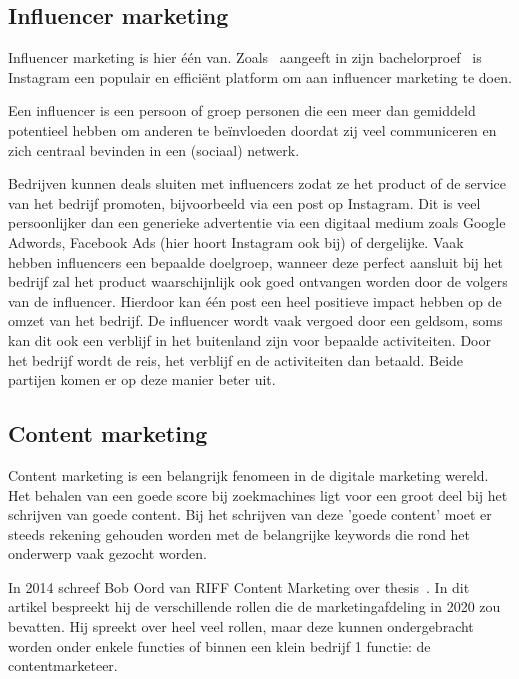 \subsection{Influencer marketing}
\label{sec:influencer-marketing}
Influencer marketing is hier één van. Zoals~\textcite{Pieters2018} aangeeft in zijn bachelorproef~ is Instagram een populair en efficiënt platform om aan influencer marketing te doen. 

Een influencer is een persoon of groep personen die een meer dan gemiddeld potentieel hebben om anderen te beïnvloeden doordat zij veel communiceren en zich centraal bevinden in een (sociaal) netwerk.~\autocite{Pieters2018}

Bedrijven kunnen deals sluiten met influencers zodat ze het product of de service van het bedrijf promoten, bijvoorbeeld via een post op Instagram. Dit is veel persoonlijker dan een generieke advertentie via een digitaal medium zoals Google Adwords, Facebook Ads (hier hoort Instagram ook bij) of dergelijke. Vaak hebben influencers een bepaalde doelgroep, wanneer deze perfect aansluit bij het bedrijf zal het product waarschijnlijk ook goed ontvangen worden door de volgers van de influencer. Hierdoor kan één post een heel positieve impact hebben op de omzet van het bedrijf. De influencer wordt vaak vergoed door een geldsom, soms kan dit ook een verblijf in het buitenland zijn voor bepaalde activiteiten. Door het bedrijf wordt de reis, het verblijf en de activiteiten dan betaald. Beide partijen komen er op deze manier beter uit.


\subsection{Content marketing}
\label{sec:content-marketing}
Content marketing is een belangrijk fenomeen in de digitale marketing wereld. Het behalen van een goede score bij zoekmachines ligt voor een groot deel bij het schrijven van goede content. Bij het schrijven van deze 'goede content' moet er steeds rekening gehouden worden met de belangrijke keywords die rond het onderwerp vaak gezocht worden. 

In 2014 schreef Bob Oord van RIFF Content Marketing over thesis~. In dit artikel bespreekt hij de verschillende rollen die de marketingafdeling in 2020 zou bevatten. Hij spreekt over heel veel rollen, maar deze kunnen ondergebracht worden onder enkele functies of binnen een klein bedrijf 1 functie: de contentmarketeer. 

